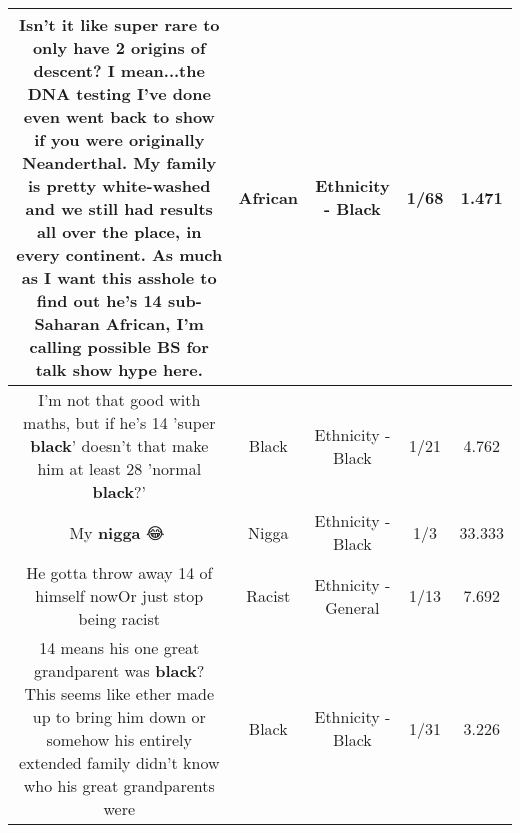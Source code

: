 \documentclass[11pt]{article}
\newlength\mylength
\begin{document}
\begin{center}
\begin{longtable}{|C{.65\mylength}|C{.30\mylength}|C{.12\mylength}|C{.12\mylength}|C{.12\mylength}|}
  \small Isn't it like super rare to only have 2 origins of descent?  I mean...the DNA testing I've done even went back to show if you were originally Neanderthal.  My family is pretty white-washed and we still had results all over the place, in every continent.  As much as I want this asshole to find out he's 14 sub-Saharan \textbf{African}, I'm calling possible BS for talk show hype here.\normalsize   & African & Ethnicity - Black & 1/68 & 1.471 \\  \hline
  \small I'm not that good with maths, but if he's 14 'super \textbf{black}' doesn't that make him at least 28 'normal \textbf{black}?'\normalsize   & Black & Ethnicity - Black & 1/21 & 4.762 \\  \hline
  \small My \textbf{nigga} 😂🤣\normalsize   & Nigga & Ethnicity - Black & 1/3 & 33.333 \\  \hline
  \small He gotta throw away 14 of himself nowOr just stop being racist\normalsize   & Racist & Ethnicity - General & 1/13 & 7.692 \\  \hline
  \small 14 means his  one great grandparent was \textbf{black}? This seems like ether made up to bring him down or somehow his entirely extended family didn't know who his great grandparents were\normalsize   & Black & Ethnicity - Black & 1/31 & 3.226 \\  \hline

\end{longtable}
\end{center}
\end{document}
